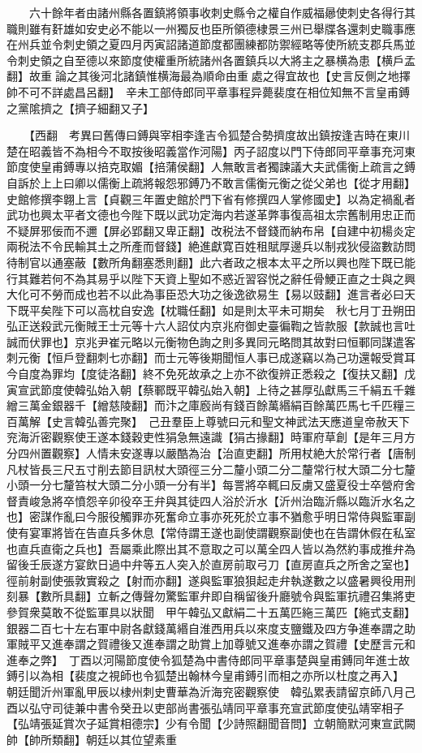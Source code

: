 　　六十餘年者由諸州縣各置鎮將領事收刺史縣令之權自作威福曏使刺史各得行其職則雖有姧雄如安史必不能以一州獨反也臣所領德棣景三州已舉牒各還刺史職事應在州兵並令刺史領之夏四月丙寅詔諸道節度都團練都防禦經略等使所統支郡兵馬並令刺史領之自至德以來節度使權重所統諸州各置鎮兵以大將主之暴横為患【横戶孟翻】故重論之其後河北諸鎮惟横海最為順命由重處之得宜故也【史言反側之地擇帥不可不詳處昌呂翻】　辛未工部侍郎同平章事程异薨裴度在相位知無不言皇甫鎛之黨隂擠之【擠子細翻又子】

　　【西翻　考異曰舊傳曰鎛與宰相李逢吉令狐楚合勢擠度故出鎮按逢吉時在東川楚在昭義皆不為相今不取按後昭義當作河陽】丙子詔度以門下侍郎同平章事充河東節度使皇甫鎛專以掊克取媚【掊蒲侯翻】人無敢言者獨諫議大夫武儒衡上疏言之鎛自訴於上上曰卿以儒衡上疏將報怨邪鎛乃不敢言儒衡元衡之從父弟也【從才用翻】　史館修撰李翺上言【貞觀三年置史館於門下省有修撰四人掌修國史】以為定禍亂者武功也興太平者文德也今陛下既以武功定海内若遂革弊事復高祖太宗舊制用忠正而不疑屏邪佞而不邇【屏必郢翻又卑正翻】改税法不督錢而納布帛【自建中初楊炎定兩税法不令民輸其土之所產而督錢】絶進獻寛百姓租賦厚邊兵以制戎狄侵盜數訪問待制官以通塞蔽【數所角翻塞悉則翻】此六者政之根本太平之所以興也陛下既已能行其難若何不為其易乎以陛下天資上聖如不惑近習容悦之辭任骨鯁正直之士與之興大化可不勞而成也若不以此為事臣恐大功之後逸欲易生【易以豉翻】進言者必曰天下既平矣陛下可以高枕自安逸【枕職任翻】如是則太平未可期矣　秋七月丁丑朔田弘正送殺武元衡賊王士元等十六人詔仗内京兆府御史臺徧鞫之皆款服【款誠也言吐誠而伏罪也】京兆尹崔元略以元衡物色詢之則多異同元略問其故對曰恒鄆同謀遣客刺元衡【恒戶登翻刺七亦翻】而士元等後期聞恒人事已成遂竊以為己功還報受賞耳今自度為罪均【度徒洛翻】終不免死故承之上亦不欲復辨正悉殺之【復扶又翻】戊寅宣武節度使韓弘始入朝【蔡鄆既平韓弘始入朝】上待之甚厚弘獻馬三千絹五千雜繒三萬金銀器千【繒慈陵翻】而汴之庫廏尚有錢百餘萬緡絹百餘萬匹馬七千匹糧三百萬解【史言韓弘善完聚】　己丑羣臣上尊號曰元和聖文神武法天應道皇帝赦天下兖海沂密觀察使王遂本錢穀吏性狷急無遠識【狷古掾翻】時軍府草創【是年三月方分四州置觀察】人情未安遂專以嚴酷為治【治直吏翻】所用杖絶大於常行者【唐制凡杖皆長三尺五寸削去節目訊杖大頭徑三分二釐小頭二分二釐常行杖大頭二分七釐小頭一分七釐笞杖大頭二分小頭一分有半】每詈將卒輒曰反虜又盛夏役士卒營府舍督責峻急將卒憤怨辛卯役卒王弁與其徒四人浴於沂水【沂州治臨沂縣以臨沂水名之也】密謀作亂曰今服役觸罪亦死奮命立事亦死死於立事不猶愈乎明日常侍與監軍副使有宴軍將皆在告直兵多休息【常侍謂王遂也副使謂觀察副使也在告謂休假在私室也直兵直衛之兵也】吾屬乘此際出其不意取之可以萬全四人皆以為然約事成推弁為留後壬辰遂方宴飲日過中弁等五人突入於直房前取弓刀【直房直兵之所舍之室也】徑前射副使張敦實殺之【射而亦翻】遂與監軍狼狽起走弁執遂數之以盛暑興役用刑刻暴【數所具翻】立斬之傳聲勿驚監軍弁即自稱留後升廳號令與監軍抗禮召集將吏參賀衆莫敢不從監軍具以狀聞　甲午韓弘又獻絹二十五萬匹絁三萬匹【絁式支翻】銀器二百七十左右軍中尉各獻錢萬緡自淮西用兵以來度支鹽鐵及四方争進奉謂之助軍賊平又進奉謂之賀禮後又進奉謂之助賞上加尊號又進奉亦謂之賀禮【史歷言元和進奉之弊】　丁酉以河陽節度使令狐楚為中書侍郎同平章事楚與皇甫鎛同年進士故鎛引以為相【裴度之視師也令狐楚出翰林今皇甫鎛引而相之亦所以杜度之再入】　朝廷聞沂州軍亂甲辰以棣州刺史曹華為沂海兖密觀察使　韓弘累表請留京師八月己酉以弘守司徒兼中書令癸丑以吏部尚書張弘靖同平章事充宣武節度使弘靖宰相子【弘靖張延賞次子延賞相德宗】少有令聞【少詩照翻聞音問】立朝簡默河東宣武闕帥【帥所類翻】朝廷以其位望素重